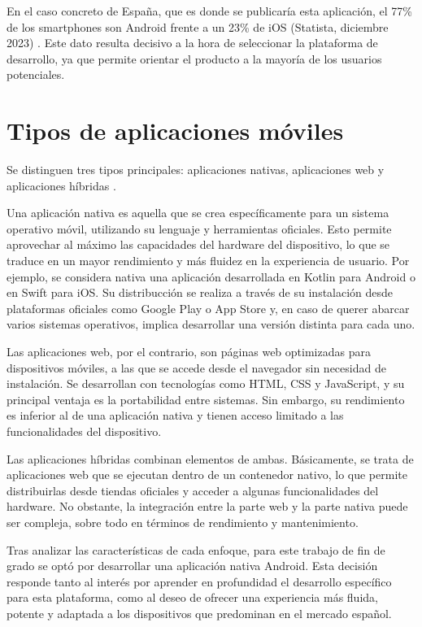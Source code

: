 En el caso concreto de España, que es donde se publicaría esta aplicación, el 77\% de los smartphones son Android frente a un 23\% de iOS (Statista, diciembre 2023) \cite{apps-market}. Este dato resulta decisivo a la hora de seleccionar la plataforma de desarrollo, ya que permite orientar el producto a la mayoría de los usuarios potenciales.

\section{Tipos de aplicaciones móviles}

Se distinguen tres tipos principales: aplicaciones nativas, aplicaciones web y aplicaciones híbridas \cite{apps-types, native-hybrid-apps, apps-types-difference}.

Una aplicación nativa es aquella que se crea específicamente para un sistema operativo móvil, utilizando su lenguaje y herramientas oficiales. Esto permite aprovechar al máximo las capacidades del hardware del dispositivo, lo que se traduce en un mayor rendimiento y más fluidez en la experiencia de usuario. Por ejemplo, se considera nativa una aplicación desarrollada en Kotlin para Android o en Swift para iOS. Su distribucción se realiza a través de su instalación desde plataformas oficiales como Google Play o App Store y, en caso de querer abarcar varios sistemas operativos, implica desarrollar una versión distinta para cada uno.

Las aplicaciones web, por el contrario, son páginas web optimizadas para dispositivos móviles, a las que se accede desde el navegador sin necesidad de instalación. Se desarrollan con tecnologías como HTML, CSS y JavaScript, y su principal ventaja es la portabilidad entre sistemas. Sin embargo, su rendimiento es inferior al de una aplicación nativa y tienen acceso limitado a las funcionalidades del dispositivo.

Las aplicaciones híbridas combinan elementos de ambas. Básicamente, se trata de aplicaciones web que se ejecutan dentro de un contenedor nativo, lo que permite distribuirlas desde tiendas oficiales y acceder a algunas funcionalidades del hardware. No obstante, la integración entre la parte web y la parte nativa puede ser compleja, sobre todo en términos de rendimiento y mantenimiento.

Tras analizar las características de cada enfoque, para este trabajo de fin de grado se optó por desarrollar una aplicación nativa Android. Esta decisión responde tanto al interés por aprender en profundidad el desarrollo específico para esta plataforma, como al deseo de ofrecer una experiencia más fluida, potente y adaptada a los dispositivos que predominan en el mercado español.

